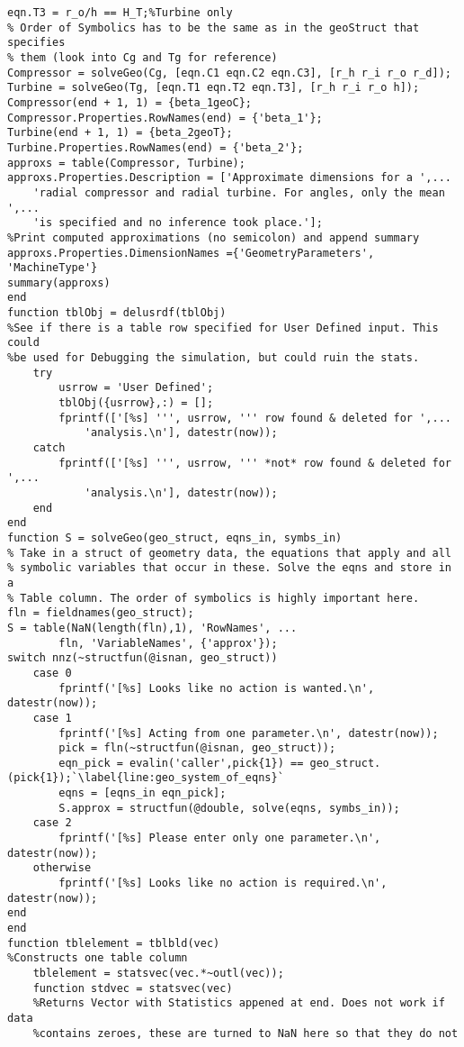 \begin{lstlisting}
eqn.T3 = r_o/h == H_T;%Turbine only
% Order of Symbolics has to be the same as in the geoStruct that specifies
% them (look into Cg and Tg for reference)
Compressor = solveGeo(Cg, [eqn.C1 eqn.C2 eqn.C3], [r_h r_i r_o r_d]);
Turbine = solveGeo(Tg, [eqn.T1 eqn.T2 eqn.T3], [r_h r_i r_o h]);
Compressor(end + 1, 1) = {beta_1geoC};
Compressor.Properties.RowNames(end) = {'beta_1'};
Turbine(end + 1, 1) = {beta_2geoT};
Turbine.Properties.RowNames(end) = {'beta_2'};
approxs = table(Compressor, Turbine);
approxs.Properties.Description = ['Approximate dimensions for a ',...
    'radial compressor and radial turbine. For angles, only the mean ',...
    'is specified and no inference took place.'];
%Print computed approximations (no semicolon) and append summary
approxs.Properties.DimensionNames ={'GeometryParameters', 'MachineType'}
summary(approxs)
end
function tblObj = delusrdf(tblObj)
%See if there is a table row specified for User Defined input. This could
%be used for Debugging the simulation, but could ruin the stats.
    try
        usrrow = 'User Defined';
        tblObj({usrrow},:) = [];
        fprintf(['[%s] ''', usrrow, ''' row found & deleted for ',...
            'analysis.\n'], datestr(now));
    catch
        fprintf(['[%s] ''', usrrow, ''' *not* row found & deleted for ',...
            'analysis.\n'], datestr(now));
    end
end
function S = solveGeo(geo_struct, eqns_in, symbs_in)
% Take in a struct of geometry data, the equations that apply and all
% symbolic variables that occur in these. Solve the eqns and store in a
% Table column. The order of symbolics is highly important here.
fln = fieldnames(geo_struct);
S = table(NaN(length(fln),1), 'RowNames', ...
        fln, 'VariableNames', {'approx'});
switch nnz(~structfun(@isnan, geo_struct))
    case 0
        fprintf('[%s] Looks like no action is wanted.\n', datestr(now));
    case 1
        fprintf('[%s] Acting from one parameter.\n', datestr(now));
        pick = fln(~structfun(@isnan, geo_struct));
        eqn_pick = evalin('caller',pick{1}) == geo_struct.(pick{1});`\label{line:geo_system_of_eqns}`
        eqns = [eqns_in eqn_pick];
        S.approx = structfun(@double, solve(eqns, symbs_in));
    case 2
        fprintf('[%s] Please enter only one parameter.\n', datestr(now));
    otherwise
        fprintf('[%s] Looks like no action is required.\n', datestr(now));
end
end
function tblelement = tblbld(vec)
%Constructs one table column
    tblelement = statsvec(vec.*~outl(vec));
    function stdvec = statsvec(vec)
    %Returns Vector with Statistics appened at end. Does not work if data
    %contains zeroes, these are turned to NaN here so that they do not

\end{lstlisting}
